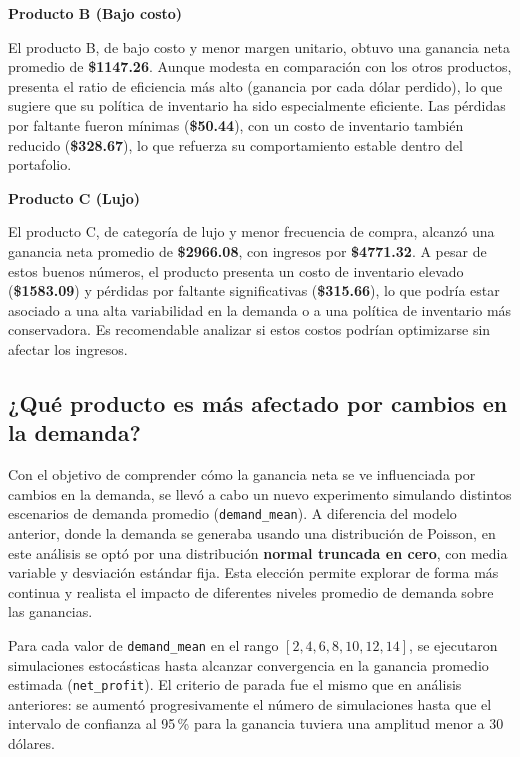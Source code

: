 \documentclass{report}
\begin{document}
        \vspace*{0.5cm}

        \textbf{Producto B (Bajo costo)}

        El producto B, de bajo costo y menor margen unitario, obtuvo una ganancia neta promedio de \textbf{\$1147.26}. Aunque modesta en comparación con los otros productos, presenta el ratio de eficiencia más alto (ganancia por cada dólar perdido), lo que sugiere que su política de inventario ha sido especialmente eficiente. Las pérdidas por faltante fueron mínimas (\textbf{\$50.44}), con un costo de inventario también reducido (\textbf{\$328.67}), lo que refuerza su comportamiento estable dentro del portafolio.

        \vspace*{0.5cm}

        \textbf{Producto C (Lujo)}

        El producto C, de categoría de lujo y menor frecuencia de compra, alcanzó una ganancia neta promedio de \textbf{\$2966.08}, con ingresos por \textbf{\$4771.32}. A pesar de estos buenos números, el producto presenta un costo de inventario elevado (\textbf{\$1583.09}) y pérdidas por faltante significativas (\textbf{\$315.66}), lo que podría estar asociado a una alta variabilidad en la demanda o a una política de inventario más conservadora. Es recomendable analizar si estos costos podrían optimizarse sin afectar los ingresos.

    \subsection{¿Qué producto es más afectado por cambios en la demanda?}

        Con el objetivo de comprender cómo la ganancia neta se ve influenciada por cambios en la demanda, se llevó a cabo un nuevo experimento simulando distintos escenarios de demanda promedio (\texttt{demand\_mean}). A diferencia del modelo anterior, donde la demanda se generaba usando una distribución de Poisson, en este análisis se optó por una distribución \textbf{normal truncada en cero}, con media variable y desviación estándar fija. Esta elección permite explorar de forma más continua y realista el impacto de diferentes niveles promedio de demanda sobre las ganancias.

        Para cada valor de \texttt{demand\_mean} en el rango $[2, 4, 6, 8, 10, 12, 14]$, se ejecutaron simulaciones estocásticas hasta alcanzar convergencia en la ganancia promedio estimada (\texttt{net\_profit}). El criterio de parada fue el mismo que en análisis anteriores: se aumentó progresivamente el número de simulaciones hasta que el intervalo de confianza al 95\,\% para la ganancia tuviera una amplitud menor a 30 dólares.
\end{document}
